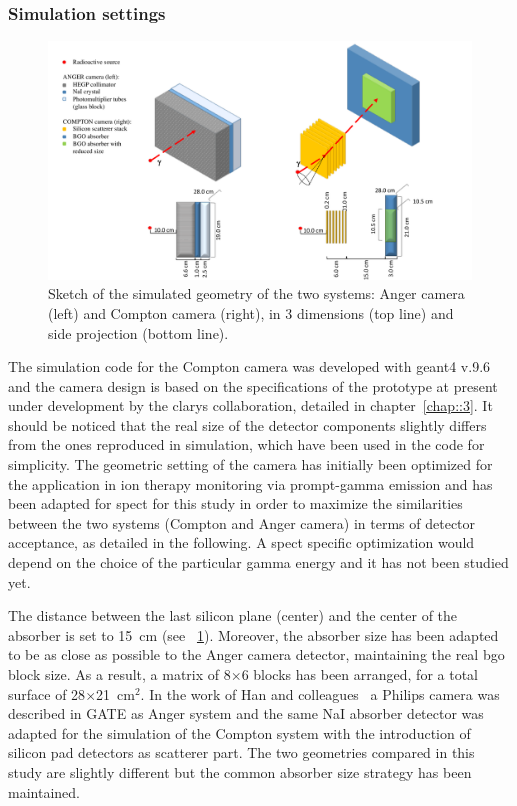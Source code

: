 \subsubsection{Simulation settings}\label{chap5::subsubsec::CC_settings}
\begin{figure}
  \centering
  \includegraphics[width=1.1\linewidth]{03_GraphicFiles/chapter5_SPECTsimu/SPECT/schema_withRedAbs}
  \caption{Sketch of the simulated geometry of the two systems: Anger camera (left) and Compton camera (right), in 3 dimensions (top line) and side projection (bottom line).}
  \label{chap5::fig::geometry_schema}
\end{figure}

The simulation code for the Compton camera was developed with \gls{geant4} v.9.6 and the camera design is based on the specifications of the prototype at present under development by the \gls{clarys} collaboration, detailed in chapter~\ref{chap::3}. It should be noticed that the real size of the detector components slightly differs from the ones reproduced in simulation, which have been used in the code for simplicity. The geometric setting of the camera has initially been optimized for the application in ion therapy monitoring via prompt-gamma emission and has been adapted for \gls{spect} for this study in order to maximize the similarities between the two systems (Compton and Anger camera) in terms of detector acceptance, as detailed in the following. A \gls{spect} specific optimization would depend on the choice of the particular gamma energy and it has not been studied yet.

The distance between the last silicon plane (center) and the center of the absorber is set to 15~cm (see \figurename~\ref{chap5::fig::geometry_schema}).  Moreover, the absorber size has been adapted to be as close as possible to the Anger camera detector, maintaining the real \gls{bgo} block size. As a result, a matrix of 8$\times$6 blocks has been arranged, for a total surface of 28$\times$21~cm$^{2}$.
In the work of Han and colleagues~\parencite{Han2008} a Philips camera was described in GATE as Anger system and the same NaI absorber detector was adapted for the simulation of the Compton system with the introduction of silicon pad detectors as scatterer part. The two geometries compared in this study are slightly different but the common absorber size strategy has been maintained.

